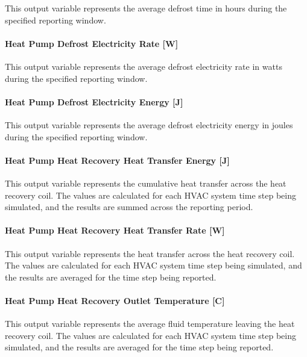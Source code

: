 This output variable represents the average defrost time in hours during the specified reporting window.

\paragraph{Heat Pump Defrost Electricity Rate {[}W{]}}\label{plhp_eir_outputs_defrost_electric_rate}

This output variable represents the average defrost electricity rate in watts during the specified reporting window.

\paragraph{Heat Pump Defrost Electricity Energy {[}J{]}}\label{plhp_eir_outputs_defrost_electric_energy}

This output variable represents the average defrost electricity energy in joules during the specified reporting window.

\paragraph{Heat Pump Heat Recovery Heat Transfer Energy {[}J{]}}\label{air-to-water-heat-pump-heat-recovery-heat-transfer-energy-j}

This output variable represents the cumulative heat transfer across the heat recovery coil. The values are calculated for each HVAC system time step being simulated, and the results are summed across the reporting period.

\paragraph{Heat Pump Heat Recovery Heat Transfer Rate {[}W{]}}\label{air-to-water-heat-pump-heat-recovery-heat-transfer-rate-w}

This output variable represents the heat transfer across the heat recovery coil. The values are calculated for each HVAC system time step being simulated, and the results are averaged for the time step being reported.
   
\paragraph{Heat Pump Heat Recovery Outlet Temperature {[}C{]}}\label{air-to-water-heat-pump-heat-recovery-outlet-temperature-c}

This output variable represents the average fluid temperature leaving the heat recovery coil. The values are calculated for each HVAC system time step being simulated, and the results are averaged for the time step being reported.

